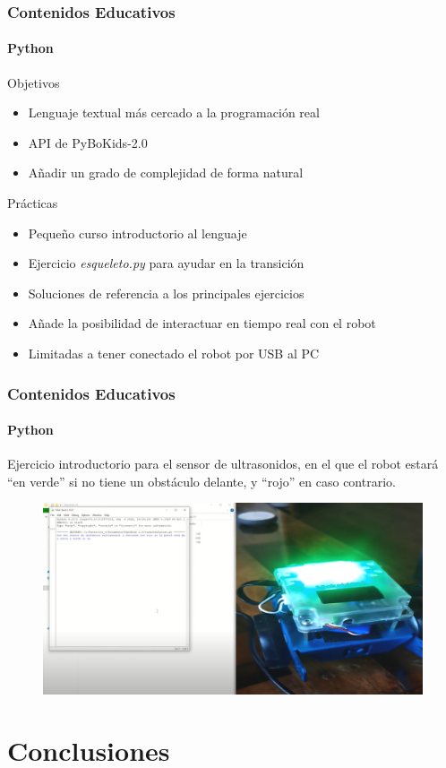 \documentclass{beamer}
\begin{document}
\begin{frame}
\frametitle{Contenidos Educativos}
\framesubtitle{Python}
	\begin{block}{Objetivos}
		\begin{itemize}
			\item Lenguaje textual más cercado a la programación real
			\item API de PyBoKids-2.0
			\item Añadir un grado de complejidad de forma natural
		\end{itemize}
	\end{block}
\begin{block}{Prácticas}
	\begin{itemize}
		\item Pequeño curso introductorio al lenguaje 
		\item Ejercicio \emph{esqueleto.py} para ayudar en la transición 
		\item Soluciones de referencia a los principales ejercicios
		\item Añade la posibilidad de interactuar en tiempo real con el robot
		\item Limitadas a tener conectado el robot por USB al PC
	\end{itemize}
\end{block}
\end{frame}
\begin{frame}
\frametitle{Contenidos Educativos}
\framesubtitle{Python}
	Ejercicio introductorio para el sensor de ultrasonidos, en el que el robot estará ``en verde'' si no tiene un obstáculo delante, y ``rojo'' en caso contrario.
	\begin{figure}
		\centering
		\includegraphics[width=\textwidth]{ejemplopython.png}
	\end{figure}
\end{frame}

\section{Conclusiones}
\end{document}
